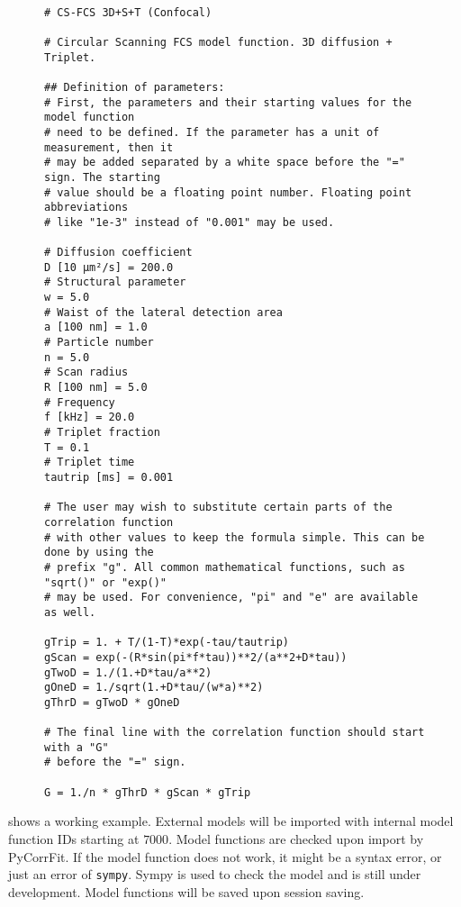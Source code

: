 \begin{figure}[tp]
\small
\begin{Verbatim}[frame = single]

# CS-FCS 3D+S+T (Confocal)

# Circular Scanning FCS model function. 3D diffusion + Triplet.

## Definition of parameters:
# First, the parameters and their starting values for the model function
# need to be defined. If the parameter has a unit of measurement, then it 
# may be added separated by a white space before the "=" sign. The starting
# value should be a floating point number. Floating point abbreviations 
# like "1e-3" instead of "0.001" may be used.

# Diffusion coefficient
D [10 µm²/s] = 200.0
# Structural parameter
w = 5.0
# Waist of the lateral detection area
a [100 nm] = 1.0
# Particle number
n = 5.0
# Scan radius
R [100 nm] = 5.0
# Frequency
f [kHz] = 20.0
# Triplet fraction
T = 0.1
# Triplet time
tautrip [ms] = 0.001

# The user may wish to substitute certain parts of the correlation function
# with other values to keep the formula simple. This can be done by using the
# prefix "g". All common mathematical functions, such as "sqrt()" or "exp()"
# may be used. For convenience, "pi" and "e" are available as well.

gTrip = 1. + T/(1-T)*exp(-tau/tautrip)
gScan = exp(-(R*sin(pi*f*tau))**2/(a**2+D*tau))
gTwoD = 1./(1.+D*tau/a**2)
gOneD = 1./sqrt(1.+D*tau/(w*a)**2)
gThrD = gTwoD * gOneD

# The final line with the correlation function should start with a "G"
# before the "=" sign.

G = 1./n * gThrD * gScan * gTrip

\end{Verbatim}
\end{figure}
 shows a working example. External models will be imported with internal model function IDs starting at $7000$. Model functions are checked upon import by PyCorrFit. If the model function does not work, it might be a syntax error, or just an error of \texttt{sympy}. Sympy is used to check the model and is still under development. Model functions will be saved upon session saving.


